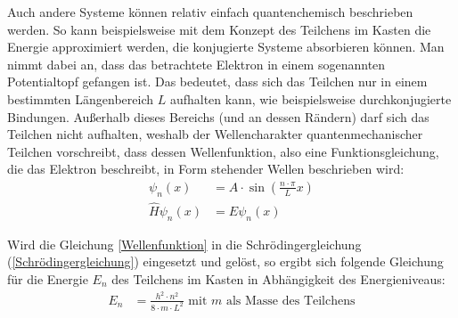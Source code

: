 \documentclass[../main.tex]{subfiles}
\begin{document}
Auch andere Systeme können relativ einfach quantenchemisch beschrieben werden. So kann beispielsweise mit dem Konzept des Teilchens im Kasten die Energie approximiert werden, die konjugierte Systeme absorbieren können. Man nimmt dabei an, dass das betrachtete Elektron in einem sogenannten Potentialtopf gefangen ist. Das bedeutet, dass sich das Teilchen nur in einem bestimmten Längenbereich $L$ aufhalten kann, wie beispielsweise durchkonjugierte Bindungen. Außerhalb dieses Bereichs (und an dessen Rändern) darf sich das Teilchen nicht aufhalten, weshalb der Wellencharakter quantenmechanischer Teilchen vorschreibt, dass dessen Wellenfunktion, also eine Funktionsgleichung, die das Elektron beschreibt, in Form stehender Wellen beschrieben wird:
\begin{align}
    \psi_n(x) &= A\cdot\sin\left(\frac{n\cdot\pi}{L}x\right)\label{Wellenfunktion}\\
    \hat{H}\psi_n(x) &= E\psi_n(x)\label{Schrödingergleichung}
\end{align}

Wird die Gleichung \ref{Wellenfunktion} in die Schrödingergleichung (\ref{Schrödingergleichung}) eingesetzt und gelöst, so ergibt sich folgende Gleichung für die Energie $E_n$ des Teilchens im Kasten in Abhängigkeit des Energieniveaus:
\begin{align}
    E_n &= \frac{h^2\cdot n^2}{8\cdot m\cdot L^2} \text{ mit }m\text{ als Masse des Teilchens}\label{Tendersgleichung}
\end{align}
\end{document}
